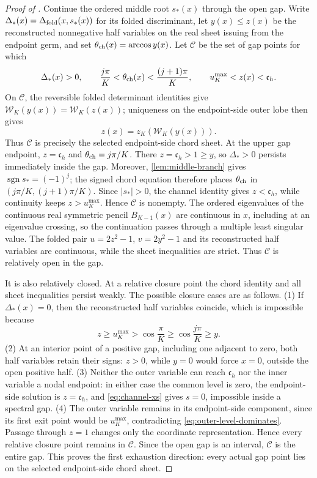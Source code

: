 \documentclass[11pt,a4paper]{article}
\numberwithin{equation}{section}
\begin{document}
\begin{proof}[Proof of ]
Continue the ordered middle root \(s_*(x)\) through the open gap.  Write
\(\Delta_*(x)=\Delta_{\rm fold}(x,s_*(x))\) for its folded discriminant,
let \(y(x)\leq z(x)\) be the reconstructed nonnegative half variables on
the real sheet issuing from the endpoint germ, and set
\(\theta_{\rm ch}(x)=\arccos y(x)\).  Let \(\mathcal C\) be the set of gap points for
which
\[
 \Delta_*(x)>0,\qquad
 \frac{j\pi}{K}<\theta_{\rm ch}(x)<\frac{(j+1)\pi}{K},\qquad
 u_K^{\max}<z(x)<\mathfrak c_h.
\]
On \(\mathcal C\), the reversible folded determinant identities give
\(\mathcal W_K(y(x))=\mathcal W_K(z(x))\); uniqueness on the endpoint-side
outer lobe then gives
\[
 z(x)=z_K(\mathcal W_K(y(x))).
\]
Thus \(\mathcal C\) is precisely the selected endpoint-side chord sheet.
At the upper gap endpoint, \(z=\mathfrak c_h\) and
\(\theta_{\rm ch}=j\pi/K\).  There
\(z=\mathfrak c_h>1\geq y\), so \(\Delta_*>0\) persists immediately
inside the gap.  Moreover,
\cref{lem:middle-branch} gives \(\operatorname{sgn}s_*=(-1)^j\); the signed
chord equation therefore places
\(\theta_{\rm ch}\) in
\((j\pi/K,(j+1)\pi/K)\).  Since \(|s_*|>0\), the channel identity gives
\(z<\mathfrak c_h\), while continuity keeps \(z>u_K^{\max}\).  Hence
\(\mathcal C\) is nonempty.  The ordered eigenvalues of the continuous real symmetric pencil
\(B_{K-1}(x)\) are continuous in \(x\), including at an eigenvalue crossing,
so the continuation passes through a multiple least singular value.  The
folded pair \(u=2z^2-1\), \(v=2y^2-1\) and its reconstructed half variables
are continuous, while the sheet inequalities are strict.  Thus
\(\mathcal C\) is relatively open in the gap.

It is also relatively closed.  At a relative closure point the chord
identity and all sheet inequalities persist weakly.  The possible closure
cases are as follows.  (1) If \(\Delta_*(x)=0\), then the reconstructed half
variables coincide, which is impossible because
\[
 z\geq u_K^{\max}>\cos\frac{\pi}{K}
 \geq\cos\frac{j\pi}{K}\geq y.
\]
(2) At an interior point of a positive gap, including one adjacent to zero,
both half variables retain their signs: \(z>0\), while \(y=0\) would force
\(x=0\), outside the open positive half.  (3) Neither the outer variable can
reach \(\mathfrak c_h\) nor the inner variable a nodal endpoint: in either
case the common level is zero, the endpoint-side solution is
\(z=\mathfrak c_h\), and \eqref{eq:channel-xs} gives \(s=0\), impossible
inside a spectral gap.  (4) The
outer variable remains in its endpoint-side component, since its first exit
point would be \(u_K^{\max}\), contradicting
\eqref{eq:outer-level-dominates}.  Passage through \(z=1\) changes only the
coordinate representation.  Hence every relative closure point remains in
\(\mathcal C\).  Since the open gap is an interval, \(\mathcal C\) is the
entire gap.  This proves the first exhaustion direction: every actual gap
point lies on the selected endpoint-side chord sheet.


\end{proof}
\end{document}

